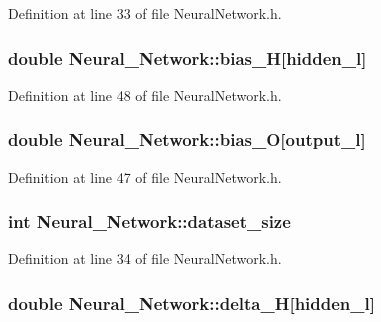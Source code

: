 Definition at line 33 of file Neural\-Network.\-h.

\hypertarget{a00003_a38808438a02d406a7ab54c8bf825752a}{
\subsubsection[{bias\-\_\-\-H}]{\setlength{\rightskip}{0pt plus 5cm}double Neural\-\_\-\-Network\-::bias\-\_\-\-H\mbox{[}{\bf hidden\-\_\-l}\mbox{]}\hspace{0.3cm}{\ttfamily [private]}}}\label{d1/d7c/a00003_a38808438a02d406a7ab54c8bf825752a}


Definition at line 48 of file Neural\-Network.\-h.

\hypertarget{a00003_a8f26363ac0ccda6f04df35e68164cd3a}{
\subsubsection[{bias\-\_\-\-O}]{\setlength{\rightskip}{0pt plus 5cm}double Neural\-\_\-\-Network\-::bias\-\_\-\-O\mbox{[}{\bf output\-\_\-l}\mbox{]}\hspace{0.3cm}{\ttfamily [private]}}}\label{d1/d7c/a00003_a8f26363ac0ccda6f04df35e68164cd3a}


Definition at line 47 of file Neural\-Network.\-h.

\hypertarget{a00003_a8fe39196b36a38696abd679328dd8232}{
\subsubsection[{dataset\-\_\-size}]{\setlength{\rightskip}{0pt plus 5cm}int Neural\-\_\-\-Network\-::dataset\-\_\-size\hspace{0.3cm}{\ttfamily [private]}}}\label{d1/d7c/a00003_a8fe39196b36a38696abd679328dd8232}


Definition at line 34 of file Neural\-Network.\-h.

\hypertarget{a00003_a51e5c2d2b53ba284c5b3791446c3b7d8}{
\subsubsection[{delta\-\_\-\-H}]{\setlength{\rightskip}{0pt plus 5cm}double Neural\-\_\-\-Network\-::delta\-\_\-\-H\mbox{[}{\bf hidden\-\_\-l}\mbox{]}\hspace{0.3cm}{\ttfamily [private]}}}\label{d1/d7c/a00003_a51e5c2d2b53ba284c5b3791446c3b7d8}


